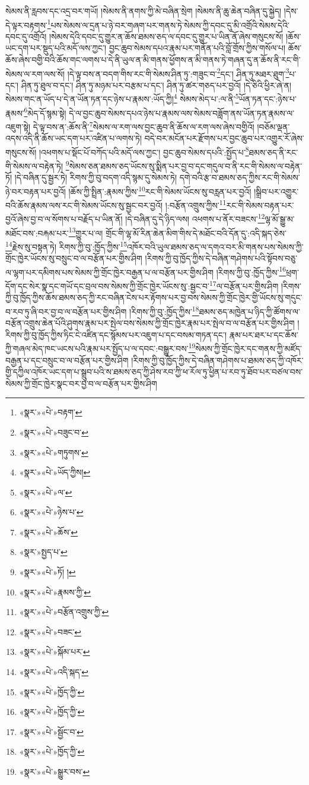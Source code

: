 སེམས་ནི་རླབས་དང་འདྲ་བར་གཡོ། །སེམས་ནི་ནགས་ཀྱི་མེ་བཞིན་སྲེག །སེམས་ནི་ཆུ་ཆེན་བཞིན་དུ་སྐྱེད། །དེས་དེ་ལྟར་བརྟགས་\footnote{«སྣར་»«པེ་»བརྟག་}པས་སེམས་ལ་དྲན་པ་ཉེ་བར་གཞག་པར་གནས་ཏེ་སེམས་ཀྱི་དབང་དུ་མི་འགྲོའི་སེམས་དེའི་དབང་དུ་འགྲོའོ། །སེམས་དེའི་དབང་དུ་གྱུར་ན་ཆོས་ཐམས་ཅད་ལ་དབང་དུ་གྱུར་པ་ཡིན་ནོ་ཞེས་གསུངས་སོ། །ཆོས་ཡང་དག་པར་སྡུད་པའི་མདོ་ལས་ཀྱང་། བྱང་ཆུབ་སེམས་དཔའ་རྣམ་པར་གནོན་པའི་བློ་གྲོས་ཀྱིས་གསོལ་པ། ཆོས་ཆོས་ཞེས་བགྱི་བའི་ཆོས་གང་ལགས་པ་དེ་ནི་ཡུལ་ན་མི་གནས་ཕྱོགས་ན་མི་གནས་ཏེ་གཞན་དུ་ན་ཆོས་ནི་རང་གི་སེམས་ལ་རག་ལས་སོ། །དེ་ལྟ་བས་ན་བདག་གིས་རང་གི་སེམས་ཤིན་ཏུ་:གཟུང་བ་\footnote{«སྣར་»«པེ་»བཟུང་བ་}དང་། ཤིན་ཏུ་མཐར་ཐུག་\footnote{«སྣར་»«པེ་»གཏུགས་}པ་དང་། ཤིན་ཏུ་ཐུལ་བ་དང་། ཤིན་ཏུ་མཉམ་པར་བརྩམ་པ་དང་། ཤིན་ཏུ་ཚར་གཅད་པར་བྱའོ། །དེ་ཅིའི་ཕྱིར་ཞེ་ན། སེམས་གང་ན་ཡོད་པ་དེ་ན་ཡོན་ཏན་དང་ཉེས་པ་རྣམས་:ཡོད་ཀྱི།\footnote{«སྣར་»«པེ་»ཡོད་ཀྱིས།} སེམས་མེད་པ་:ལ་ནི་\footnote{«སྣར་»«པེ་»ལ་}ཡོན་ཏན་དང་:ཉེས་པ་རྣམས་\footnote{«སྣར་»«པེ་»ཉེས་པ་}མེད་དོ་སྙམ་སྟེ། དེ་ལ་བྱང་ཆུབ་སེམས་དཔའ་ཉེས་པ་རྣམས་ལས་སེམས་བཟློག་ནས་ཡོན་ཏན་རྣམས་ལ་འཇུག་སྟེ། དེ་ལྟ་བས་ན་:ཆོས་ནི་\footnote{«སྣར་»«པེ་»ཆོས་}སེམས་ལ་རག་ལས་བྱང་ཆུབ་ནི་ཆོས་ལ་རག་ལས་ཞེས་བགྱིའོ། །བཅོམ་ལྡན་འདས་འདི་ནི་ཆོས་ཡང་དག་པར་འཛིན་པ་ལགས་ཏེ། བདེ་བར་མངོན་པར་རྫོགས་པར་བྱང་ཆུབ་པར་འགྱུར་རོ་ཞེས་གསུངས་སོ། །འཕགས་པ་སྡོང་པོ་བཀོད་པའི་མདོ་ལས་ཀྱང་། བྱང་ཆུབ་སེམས་དཔའི་:སྤྱོད་པ་\footnote{«སྣར་»སྤྱད་པ་}ཐམས་ཅད་ནི་རང་གི་སེམས་ལ་བརྟེན་ཏེ། \footnote{«སྣར་»«པེ་»ཏོ། ། }སེམས་ཅན་ཐམས་ཅད་ཡོངས་སུ་སྨིན་པར་བྱ་བ་དང་གདུལ་བ་ནི་རང་གི་སེམས་ལ་བརྟེན་ཏོ། །དེ་བཞིན་དུ་སྦྱར་ཏེ། རིགས་ཀྱི་བུ་བདག་འདི་སྙམ་དུ་སེམས་ཏེ། དགེ་བའི་རྩ་བ་ཐམས་ཅད་ཀྱིས་རང་གི་སེམས་ཉེ་བར་བརྟན་པར་བྱའོ། །ཆོས་ཀྱི་སྤྲིན་:རྣམས་ཀྱིས་\footnote{«སྣར་»«པེ་»རྣམས་ཀྱི་}རང་གི་སེམས་ཡོངས་སུ་བརླན་པར་བྱའོ། །སྒྲིབ་པར་འགྱུར་བའི་ཆོས་རྣམས་ལས་རང་གི་སེམས་ཡོངས་སུ་སྦྱང་བར་བྱའོ། །:བརྩོན་འགྲུས་ཀྱིས་\footnote{«སྣར་»«པེ་»བརྩོན་འགྲུས་ཀྱི་}རང་གི་སེམས་བརྟན་པར་བྱའོ་ཞེས་བྱ་བ་ལ་སོགས་པ་བརྗོད་པ་ཡིན་ནོ། །དེ་བཞིན་དུ་དེ་ཉིད་ལས། འཕགས་པ་ནོར་བཟངས་\footnote{«སྣར་»«པེ་»བཟང་}ལྷ་མོ་སྒྱུ་མ་མཐོང་བས་:བརྐམ་པར་\footnote{«སྣར་»«པེ་»སྐོམ་པར་}གྱུར་པ་ལ། གྲོང་གི་ལྷ་མོ་རིན་ཆེན་མིག་གིས་དེ་མཐོང་བའི་དོན་དུ་:འདི་སྐད་ཅེས་\footnote{«སྣར་»«པེ་»འདི་སྐད་}རྗེས་སུ་བསྟན་ཏེ། རིགས་ཀྱི་བུ་:ཁྱོད་ཀྱིས་\footnote{«སྣར་»«པེ་»ཁྱོད་ཀྱི་}འཁོར་བའི་ཡུལ་ཐམས་ཅད་ལ་དགའ་བར་མི་གནས་པས་སེམས་ཀྱི་གྲོང་ཁྱེར་ཡོངས་སུ་བསྲུང་བ་ལ་བརྩོན་པར་གྱིས་ཤིག །རིགས་ཀྱི་བུ་ཁྱོད་ཀྱིས་དེ་བཞིན་གཤེགས་པའི་སྟོབས་བཅུ་ལ་ལྷག་པར་དམིགས་པས་སེམས་ཀྱི་གྲོང་ཁྱེར་བརྒྱན་པ་ལ་བརྩོན་པར་གྱིས་ཤིག །རིགས་ཀྱི་བུ་:ཁྱོད་ཀྱིས་\footnote{«སྣར་»«པེ་»ཁྱོད་ཀྱི་}ཕྲག་དོག་དང་སེར་སྣ་དང་གཡོ་དང་བྲལ་བས་སེམས་ཀྱི་གྲོང་ཁྱེར་ཡོངས་སུ་:སྦྱང་བ་\footnote{«སྣར་»«པེ་»སྦྱོང་བ་}ལ་བརྩོན་པར་གྱིས་ཤིག །རིགས་ཀྱི་བུ་ཁྱོད་ཀྱིས་ཆོས་ཐམས་ཅད་ཀྱི་རང་བཞིན་ངེས་པར་རྟོགས་པར་བྱ་བས་སེམས་ཀྱི་གྲོང་ཁྱེར་གྱི་ཡོངས་སུ་གདུང་བ་རབ་ཏུ་ཞི་བར་བྱ་བ་ལ་བརྩོན་པར་གྱིས་ཤིག །རིགས་ཀྱི་བུ་:ཁྱོད་ཀྱིས་\footnote{«སྣར་»«པེ་»ཁྱོད་ཀྱི་}ཐམས་ཅད་མཁྱེན་པ་ཉིད་ཀྱི་ཚོགས་ལ་བརྩོན་འགྲུས་ཆེན་པོའི་ཤུགས་རྣམ་པར་སྤེལ་བས་སེམས་ཀྱི་གྲོང་ཁྱེར་རྣམ་པར་སྤེལ་བ་ལ་བརྩོན་པར་གྱིས་ཤིག །རིགས་ཀྱི་བུ་ཁྱོད་ཀྱིས་ཏིང་ངེ་འཛིན་དང་སྙོམས་པར་འཇུག་པ་དང་བསམ་གཏན་དང་། རྣམ་པར་ཐར་པ་དང་ཆོས་ཀྱི་གཞལ་མེད་ཁང་ཡངས་པའི་རྣམ་པར་སྤྱོད་པ་ལ་དབང་:བསྒྱུར་བས་\footnote{«སྣར་»«པེ་»སྒྱུར་བས་}སེམས་ཀྱི་གྲོང་ཁྱེར་དང་གནས་ཀྱི་མཛོད་བརྒྱན་པ་དང་བསྲུང་བ་ལ་བརྩོན་པར་གྱིས་ཤིག །རིགས་ཀྱི་བུ་ཁྱོད་ཀྱིས་དེ་བཞིན་གཤེགས་པ་ཐམས་ཅད་ཀྱི་འཁོར་གྱི་དཀྱིལ་འཁོར་ཡང་དག་པ་སྒྲུབ་པའི་ས་ཐམས་ཅད་ཀྱི་ཤེས་རབ་ཀྱི་ཕ་རོལ་ཏུ་ཕྱིན་པ་རབ་ཏུ་ཐོབ་པར་བཙལ་བས་སེམས་ཀྱི་གྲོང་ཁྱེར་སྣང་བར་བྱ་བ་ལ་བརྩོན་པར་གྱིས་ཤིག 